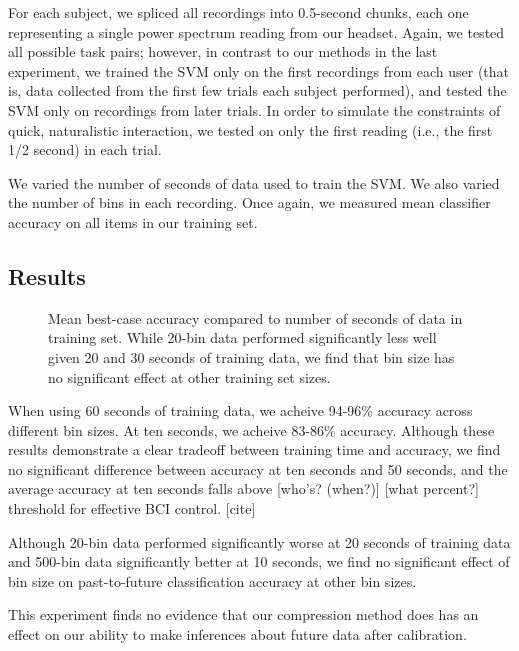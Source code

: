 For each subject, we spliced all recordings into 0.5-second chunks, each one representing a single power spectrum reading from our headset. Again, we tested all possible task pairs; however, in contrast to our methods in the last experiment, we trained the SVM only on the first recordings from each user (that is, data collected from the first few trials each subject performed), and tested the SVM only on recordings from later trials. In order to simulate the constraints of quick, naturalistic interaction, we tested on only the first reading (i.e., the first 1/2 second) in each trial. 

We varied the number of seconds of data used to train the SVM. We also varied the number of bins in each recording. Once again, we measured mean classifier accuracy on all items in our training set.

\subsection{Results}

\begin{figure}[!h]
  \vspace{-0.2cm}
  \centering
   {}
  \caption{Mean best-case accuracy compared to number of seconds of data in training set. While 20-bin data performed significantly less well given 20 and 30 seconds of training data, we find that bin size has no significant effect at other training set sizes.}
  \label{fig:fig2}
  \vspace{-0.1cm}
\end{figure}

When using 60 seconds of training data, we acheive 94-96\% accuracy across different bin sizes. At ten seconds, we acheive 83-86\% accuracy. Although these results demonstrate a clear tradeoff between training time and accuracy, we find no significant difference between accuracy at ten seconds and 50 seconds, and the average accuracy at ten seconds falls above [who's? (when?)] [what percent?] threshold for effective BCI control. [cite]

Although 20-bin data performed significantly worse at 20 seconds of training data and 500-bin data significantly better at 10 seconds, we find no significant effect of bin size on past-to-future classification accuracy at other bin sizes.

This experiment finds no evidence that our compression method does has an effect on our ability to make inferences about future data after calibration.

